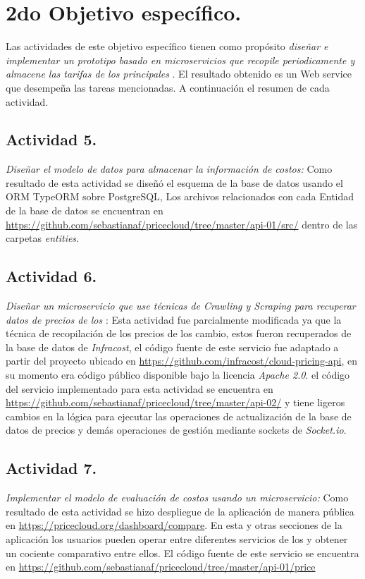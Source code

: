 \section{2do Objetivo específico.}
Las actividades de este objetivo específico tienen como propósito \emph{diseñar e implementar un prototipo basado en microservicios que recopile periodicamente y almacene las tarifas de los principales }. El resultado obtenido es un Web service que desempeña las tareas mencionadas. A continuación el resumen de cada actividad.

\subsection{Actividad 5.}
\emph{Diseñar el modelo de datos para almacenar la información de costos:}
\newline\newline
Como resultado de esta actividad se diseñó el esquema de la base de datos usando el \acrshort{ORM} \gls{TypeORM} sobre \gls{PostgreSQL}, Los archivos relacionados con cada Entidad de la base de datos se encuentran en \url{https://github.com/sebastianaf/pricecloud/tree/master/api-01/src/} dentro de las carpetas \emph{entities}.

\subsection{Actividad 6.}
\emph{Diseñar un microservicio que use técnicas de \emph{Crawling} y \emph{Scraping} para recuperar datos de precios de los }:
\newline\newline
Esta actividad fue parcialmente modificada ya que la técnica de recopilación de los precios de los  cambio, estos fueron recuperados de la base de datos de \emph{Infracost}, el código fuente de este servicio fue adaptado a partir del proyecto   ubicado en \url{https://github.com/infracost/cloud-pricing-api}, en su momento era código público disponible bajo la licencia \emph{Apache 2.0}. el código del servicio implementado para esta actividad se encuentra en \url{https://github.com/sebastianaf/pricecloud/tree/master/api-02/} y tiene ligeros cambios en la lógica para ejecutar las operaciones de actualización de la base de datos de precios y demás operaciones de gestión mediante sockets de \emph{Socket.io}.

\subsection{Actividad 7.}
\emph{Implementar el modelo de evaluación de costos usando un microservicio:}\newline\newline
Como resultado de esta actividad se hizo despliegue de la aplicación de manera pública en \url{https://pricecloud.org/dashboard/compare}. En esta y otras secciones de la aplicación los usuarios pueden operar entre diferentes servicios de los  y obtener un cociente comparativo entre ellos. El código fuente de este servicio se encuentra en \url{https://github.com/sebastianaf/pricecloud/tree/master/api-01/price}


